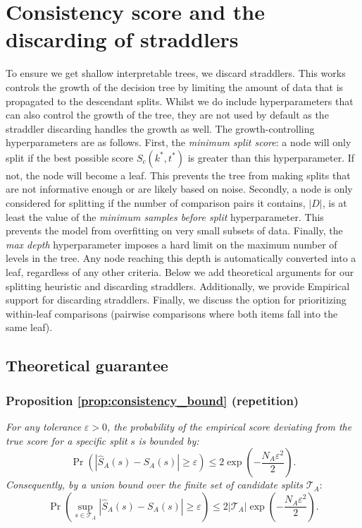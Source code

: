 \documentclass{article}
\begin{document}
\section{Consistency score and the discarding of straddlers}\label{appendix:split}
To ensure we get shallow interpretable trees, we discard straddlers. This works controls the growth of the decision tree by limiting the amount of data that is propagated to the descendant splits. Whilst we do include hyperparameters that can also control the growth of the tree, they are not used by default as the straddler discarding handles the growth as well. The growth-controlling hyperparameters are as follows. First, the \textit{minimum split score}: a node will only split if the best possible score $S_c(k^*, t^*)$ is greater than this hyperparameter. If not, the node will become a leaf. This prevents the tree from making splits that are not informative enough or are likely based on noise. Secondly, a node is only considered for splitting if the number of comparison pairs it contains, $|D|$, is at least the value of the \textit{minimum samples before split} hyperparameter. This prevents the model from overfitting on very small subsets of data. Finally, the \textit{max depth} hyperparameter imposes a hard limit on the maximum number of levels in the tree. Any node reaching this depth is automatically converted into a leaf, regardless of any other criteria. Below we add theoretical arguments for our splitting heuristic and discarding straddlers. Additionally, we provide Empirical support for discarding straddlers. Finally, we discuss the option for prioritizing within-leaf comparisons (pairwise comparisons where both items fall into the same leaf).

\subsection{Theoretical guarantee}

\subsubsection*{Proposition \ref{prop:consistency_bound} (repetition)}
\textit{For any tolerance} $\varepsilon>0$\textit{, the probability of the empirical score deviating from the true score for a specific split }$s$ \textit{is bounded by:}
\[
\Pr\!\left(
\left|
\widehat S_A(s)-S_A(s)
\right|
\ge \varepsilon
\right)
\le
2\exp\!\left(-\frac{N_A\varepsilon^2}{2}\right).
\]
\textit{Consequently, by a union bound over the finite set of candidate splits }$\mathcal{T}_A$:
\[
\Pr\!\left(
\sup_{s\in\mathcal{T}_A}
\left|
\widehat S_A(s)-S_A(s)
\right|
\ge \varepsilon
\right)
\le
2|\mathcal{T}_A|
\exp\!\left(-\frac{N_A\varepsilon^2}{2}\right).
\]
\end{document}
